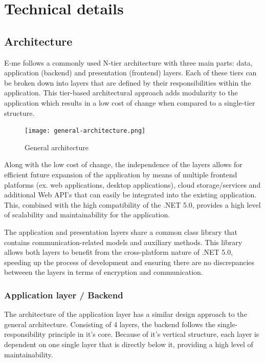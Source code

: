 \chapter{Technical details}\label{ch:IMPLEMENTATION}

\section{Architecture}

E-me follows a commonly used N-tier architecture with three main parts: data, application (backend) and presentation (frontend) layers.
Each of these tiers can be broken down into layers that are defined by their responsibilities within the application.
This tier-based architectural approach adds modularity to the application which results in a low cost of change when compared to a single-tier structure.

\begin{figure}[h]
	\centering
	\texttt{[image: general-architecture.png]}
	\caption{General architecture}
\end{figure}

Along with the low cost of change, the independence of the layers allows for efficient future expansion of 
the application by means of multiple frontend platforms (ex. web applications, desktop applications), cloud storage/services and additional
Web API's that can easily be integrated into the existing application.
This, combined with the high compatibility of the .NET 5.0, provides a high level of scalability and maintainability for the application.

The application and presentation layers share a common class library that contains communication-related models and auxiliary methods.
This library allows both layers to benefit from the cross-platform nature of .NET 5.0, speeding up the process of development and
ensuring there are no discrepancies betweeen the layers in terms of encryption and communication.

\subsection{Application layer / Backend}

The architecture of the application layer has a similar design approach to the general architecture.
Consisting of 4 layers, the backend follows the single-responsibility principle in it's core.
Because of it's vertical structure, each layer is dependent on one single layer that is directly below it, providing a high level
of maintainability.


